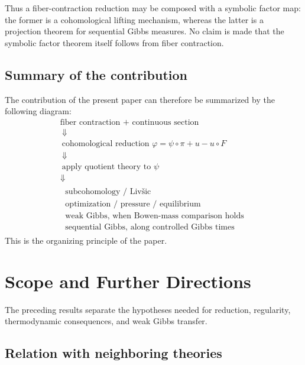 \documentclass[11pt,a4paper]{article}
\begin{document}
Thus a fiber-contraction reduction may be composed with a symbolic factor
map: the former is a cohomological lifting mechanism, whereas the latter is
a projection theorem for sequential Gibbs measures.  No claim is made that
the symbolic factor theorem itself follows from fiber contraction.

\subsection{Summary of the contribution}

The contribution of the present paper can therefore be summarized by the
following diagram:
\[
\boxed{
\begin{array}{c}
\text{fiber contraction + continuous section}\\\
\Downarrow\\\
\text{cohomological reduction }\varphi=\psi\circ\pi+u-u\circ F\\\
\Downarrow\\\
\text{apply quotient theory to }\psi\\
\Downarrow\\\
\begin{array}{c}
\text{subcohomology / Liv\v{s}ic}\\
\text{optimization / pressure / equilibrium}\\
\text{weak Gibbs, when Bowen-mass comparison holds}\\
\text{sequential Gibbs, along controlled Gibbs times}
\end{array}
\end{array}}
\]
This is the organizing principle of the paper.

\section{Scope and Further Directions}

The preceding results separate the hypotheses needed for reduction,
regularity, thermodynamic consequences, and weak Gibbs transfer.

\subsection{Relation with neighboring theories}
\end{document}

